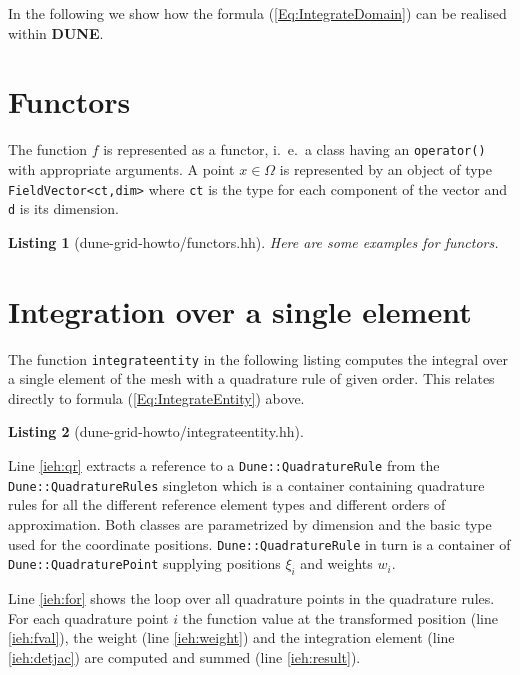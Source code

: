 \documentclass[11pt,a4paper,headinclude,footinclude,DIV16,normalheadings]{scrreprt}
\newcommand{\Dune}{{\sf\bfseries DUNE}}
\newtheorem{lst}{Listing}
\begin{document}
In the following we show how the formula (\ref{Eq:IntegrateDomain})
can be realised within \Dune.


\section{Functors}

The function $f$ is represented as a functor, i.~e.~a class having an
\lstinline!operator()! with appropriate arguments. A point
$x\in\Omega$ is represented by an object of type
\lstinline!FieldVector<ct,dim>! where \lstinline!ct! is the type for
each component of the vector and \lstinline!d! is its dimension.


\begin{lst}[dune-grid-howto/functors.hh] Here are some examples for functors.


\end{lst}


\section{Integration over a single element}

The function \lstinline!integrateentity! in the following listing
computes the integral over a single element of the mesh with a
quadrature rule of given order. 
This relates directly to formula (\ref{Eq:IntegrateEntity}) above.

\begin{lst}[dune-grid-howto/integrateentity.hh] \mbox{}


\end{lst}

Line \ref{ieh:qr} extracts a reference to a
\lstinline!Dune::QuadratureRule!  from the
\lstinline!Dune::QuadratureRules! singleton which is a container
containing quadrature rules for all the different reference element
types and different orders of approximation.  Both classes are
parametrized by dimension and the basic type used for the coordinate
positions. \lstinline!Dune::QuadratureRule! in turn is a container of
\lstinline!Dune::QuadraturePoint! supplying positions $\xi_i$ and
weights $w_i$.

Line \ref{ieh:for} shows the loop over all quadrature points in the
quadrature rules. For each quadrature point $i$ the function value at
the transformed position (line \ref{ieh:fval}), the weight (line
\ref{ieh:weight}) and the integration element (line \ref{ieh:detjac})
are computed and summed (line \ref{ieh:result}).
\end{document}
